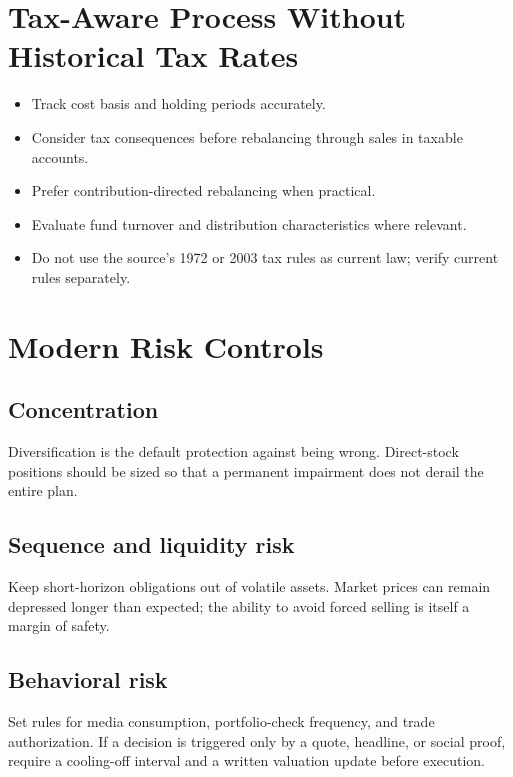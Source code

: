 \documentclass[11pt]{article}
\begin{document}
\section{Tax-Aware Process Without Historical Tax Rates}
\begin{itemize}
\item Track cost basis and holding periods accurately.
\item Consider tax consequences before rebalancing through sales in taxable accounts.
\item Prefer contribution-directed rebalancing when practical.
\item Evaluate fund turnover and distribution characteristics where relevant.
\item Do not use the source's 1972 or 2003 tax rules as current law; verify current rules separately.
\end{itemize}

\section{Modern Risk Controls}
\subsection{Concentration}
Diversification is the default protection against being wrong. Direct-stock positions should be sized so that a permanent impairment does not derail the entire plan.

\subsection{Sequence and liquidity risk}
Keep short-horizon obligations out of volatile assets. Market prices can remain depressed longer than expected; the ability to avoid forced selling is itself a margin of safety.

\subsection{Behavioral risk}
Set rules for media consumption, portfolio-check frequency, and trade authorization. If a decision is triggered only by a quote, headline, or social proof, require a cooling-off interval and a written valuation update before execution.
\end{document}
